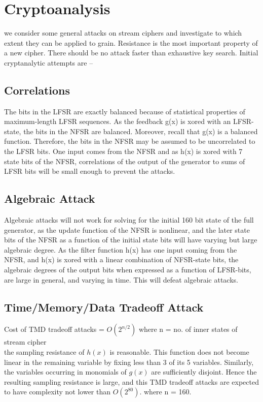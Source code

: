\section{Cryptoanalysis}
we consider some general attacks on stream ciphers and investigate to which extent they can be applied to grain. Resistance is the most important property of a new cipher. There should be no attack faster than exhaustive key search.
Initial cryptanalytic attempts are --
\subsection{Correlations}
The bits in the LFSR are exactly balanced because of statistical properties of maximum-length LFSR sequences. As the feedback g(x) is xored with an LFSR-state, the bits in the NFSR are balanced. Moreover, recall that g(x) is a balanced function. Therefore, the bits in the NFSR may be assumed to be uncorrelated to the LFSR bits. One input comes from the NFSR and as h(x) is xored with 7 state bits of the NFSR, correlations of the output of the generator to sums of LFSR bits will be small enough to prevent the attacks.
\subsection{Algebraic Attack}
Algebraic attacks will not work for solving for the initial 160 bit state of the full generator, as the update function of the NFSR is nonlinear, and the later state bits of the NFSR as a function of the initial state bits will have varying but large algebraic degree. As the filter function h(x) has one input coming from the NFSR, and h(x) is xored with a linear combination of NFSR-state bits, the algebraic degrees of the output bits when expressed as a function of LFSR-bits, are large in general, and varying in time. This will defeat algebraic attacks.
\subsection{Time/Memory/Data Tradeoff Attack}
Cost of TMD tradeoff attacks = $O(2^{n/2})$                                        where  n = no. of inner states of stream cipher\\
the sampling resistance of $h(x)$ is reasonable. This function does not become linear in the remaining variable by fixing less than 3 of its 5 variables. Similarly, the variables occurring in monomials of $g(x)$ are sufficiently disjoint. Hence the resulting sampling resistance is large, and this TMD tradeoff attacks are expected to have complexity not lower than $O(2^{80})$.                                         where n = 160.

